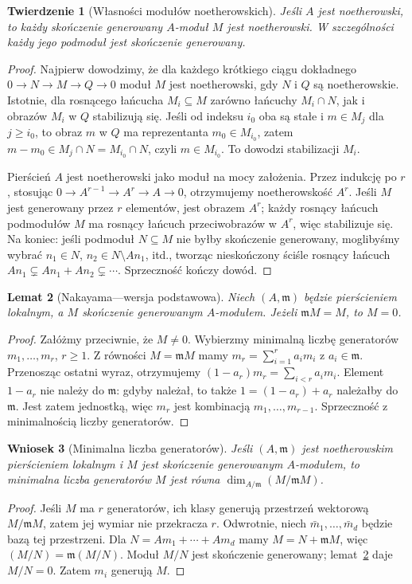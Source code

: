 \documentclass[11pt,a4paper,openany]{report}
\numberwithin{equation}{section}
\theoremstyle{plain}
\newtheorem{twierdzenie}{Twierdzenie}[section]
\newtheorem{lemat}[twierdzenie]{Lemat}
\newtheorem{wniosek}[twierdzenie]{Wniosek}
\theoremstyle{definition}
\theoremstyle{remark}
\begin{document}
\begin{twierdzenie}[Własności modułów noetherowskich]
\label{tw:noeth-mod}
Jeśli $A$ jest noetherowski, to każdy skończenie
generowany $A$-moduł $M$ jest noetherowski.
W szczególności każdy jego podmoduł jest skończenie
generowany.
\end{twierdzenie}
\begin{proof}
Najpierw dowodzimy, że dla każdego krótkiego
ciągu dokładnego $0\to N\to M\to Q\to0$
moduł $M$ jest noetherowski, gdy $N$ i $Q$ są
noetherowskie. Istotnie, dla rosnącego łańcucha
$M_i\subseteq M$ zarówno łańcuchy $M_i\cap N$,
jak i obrazów $M_i$ w $Q$ stabilizują się.
Jeśli od indeksu $i_0$ oba są stałe i $m\in M_j$
dla $j\ge i_0$, to obraz $m$ w $Q$ ma reprezentanta
$m_0\in M_{i_0}$, zatem $m-m_0\in M_j\cap N
=M_{i_0}\cap N$, czyli $m\in M_{i_0}$.
To dowodzi stabilizacji $M_i$.

Pierścień $A$ jest noetherowski jako moduł
na mocy założenia. Przez indukcję po $r$, stosując
$0\to A^{r-1}\to A^r\to A\to0$, otrzymujemy
noetherowskość $A^r$. Jeśli $M$ jest generowany
przez $r$ elementów, jest obrazem $A^r$;
każdy rosnący łańcuch podmodułów $M$ ma rosnący
łańcuch przeciwobrazów w $A^r$, więc stabilizuje się.
Na koniec: jeśli podmoduł $N\subseteq M$ nie byłby
skończenie generowany, moglibyśmy wybrać
$n_1\in N$, $n_2\in N\setminus An_1$, itd.,
tworząc nieskończony ściśle rosnący łańcuch
$An_1\subsetneq An_1+An_2\subsetneq\cdots$.
Sprzeczność kończy dowód.
\end{proof}

\begin{lemat}[Nakayama---wersja podstawowa]
\label{lem:nakayama}
Niech $(A,\mathfrak m)$ będzie pierścieniem lokalnym,
a $M$ skończenie generowanym $A$-modułem.
Jeżeli $\mathfrak m M=M$, to $M=0$.
\end{lemat}
\begin{proof}
Załóżmy przeciwnie, że $M\ne0$. Wybierzmy
minimalną liczbę generatorów $m_1,\ldots,m_r$,
$r\ge1$. Z równości $M=\mathfrak m M$ mamy
$m_r=\sum_{i=1}^r a_i m_i$ z $a_i\in\mathfrak m$.
Przenosząc ostatni wyraz, otrzymujemy
$(1-a_r)m_r=\sum_{i<r}a_i m_i$.
Element $1-a_r$ nie należy do $\mathfrak m$:
gdyby należał, to także $1=(1-a_r)+a_r$
należałby do $\mathfrak m$. Jest zatem jednostką,
więc $m_r$ jest kombinacją $m_1,\ldots,m_{r-1}$.
Sprzeczność z minimalnością liczby generatorów.
\end{proof}

\begin{wniosek}[Minimalna liczba generatorów]
\label{wn:generatory-local}
Jeśli $(A,\mathfrak m)$ jest noetherowskim pierścieniem
lokalnym i $M$ jest skończenie generowanym $A$-modułem,
to minimalna liczba generatorów $M$ jest równa
$\dim_{A/\mathfrak m}(M/\mathfrak mM)$.
\end{wniosek}
\begin{proof}
Jeśli $M$ ma $r$ generatorów, ich klasy generują
przestrzeń wektorową $M/\mathfrak mM$, zatem jej
wymiar nie przekracza $r$. Odwrotnie, niech
$\bar m_1,\ldots,\bar m_d$ będzie bazą tej przestrzeni.
Dla $N=Am_1+\cdots+Am_d$ mamy
$M=N+\mathfrak mM$, więc
$(M/N)=\mathfrak m(M/N)$. Moduł $M/N$ jest
skończenie generowany; lemat~\ref{lem:nakayama}
daje $M/N=0$. Zatem $m_i$ generują $M$.
\end{proof}
\end{document}
